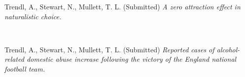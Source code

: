 \documentclass[11pt,a4paper,sans]{moderncv} %
\begin{document}
Trendl, A., Stewart, N., Mullett, T. L. (Submitted) \textit{A zero attraction effect in naturalistic choice.}

\

Trendl, A., Stewart, N., Mullett, T. L. (Submitted) \textit{Reported cases of alcohol-related domestic abuse increase following the victory of the England national football team.}

\end{document}
